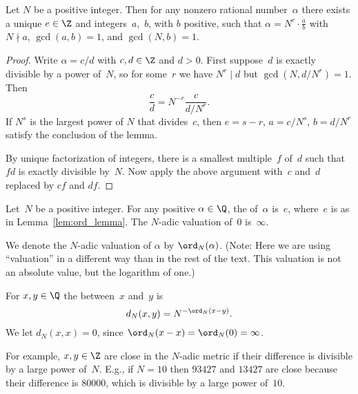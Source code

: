 \documentclass[11pt]{book}
\begin{document}
\begin{ch}
\begin{lemma}\label{lem:ord_lemma}
Let $N$ be a positive integer.  Then for any
nonzero rational number~$\alpha$ there exists a
unique $e\in\Z$ and  integers~$a$,~$b$, with $b$ positive, such that
$\alpha = N^e \cdot \frac{a}{b}$ with
$N\nmid a$, $\gcd(a,b)=1$, and $\gcd(N,b)=1$.
\end{lemma}
\begin{proof}
Write $\alpha = c/d$ with $c,d\in\Z$ and $d>0$.
First suppose~$d$ is exactly divisible by a power of~$N$,
so for some~$r$ we have $N^r\mid d$ but $\gcd(N,d/N^r)=1$.
Then
$$
  \frac{c}{d} = N^{-r} \frac{c}{d/N^r}.
$$
If $N^s$ is the largest power of $N$ that divides~$c$, then $e=s-r$,
$a=c/N^s$, $b=d/N^r$ satisfy the conclusion of the lemma.

By unique factorization of integers, there is a smallest multiple~$f$
of~$d$ such that $fd$ is exactly divisible by~$N$.  Now apply the
above argument with~$c$ and~$d$ replaced by $cf$ and $df$.
\end{proof}


\begin{definition}
\label{def:nadicvaluation}
Let~$N$ be a positive integer.  For any positive $\alpha\in\Q$, the
 of~$\alpha$ is~$e$, where~$e$ is as in
Lemma~\ref{lem:ord_lemma}.  The $N$-adic  valuation of~$0$ is~$\infty$.
\end{definition}
We denote the $N$-adic valuation of $\alpha$ by $\ord_N(\alpha)$.
(Note: Here we are using ``valuation'' in a different way than in the
rest of the text.  This valuation is not an absolute value, but the
logarithm of one.)

\begin{definition}
\label{def:nadicmetric}
For $x,y\in\Q$ the 
between~$x$ and~$y$ is
$$
  d_N(x,y) = N^{-\ord_N(x-y)}.
$$
We let $d_N(x,x) = 0$, since $\ord_N(x-x)=\ord_N(0)=\infty$.
\end{definition}
For example, $x,y\in\Z$ are close  in the $N$-adic metric if their
difference is divisible by a large power of~$N$.   E.g., if $N=10$ then
$93427$ and $13427$ are close because their difference is $80000$, which
is divisible by a large power of~$10$.


\end{ch}
\end{document}
